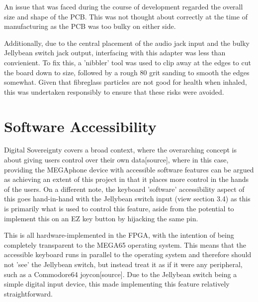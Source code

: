 An issue that was faced during the course of development regarded the overall size and shape of the PCB.
This was not thought about correctly at the time of manufacturing as the PCB was too bulky on either side.

Additionally, due to the central placement of the audio jack input and the bulky Jellybean switch jack output, interfacing with this adapter was less than convienient.
To fix this, a 'nibbler' tool was used to clip away at the edges to cut the board down to size, followed by a rough 80 grit sanding to smooth the edges somewhat.
Given that fibreglass particles are not good for health when inhaled, this was undertaken responsibly to ensure that these risks were avoided.


\section{Software Accessibility}
Digital Sovereignty covers a broad context, where the overarching concept is about giving users control over their own data[source], where in this case, providing the MEGAphone device with accessible software features can be argued as achieving an extent of this project in that it places more control in the hands of the users.
On a different note, the keyboard 'software' accessibility aspect of this goes hand-in-hand with the Jellybean switch input (view section 3.4) as this is primarily what is used to control this feature, aside from the potential to implement this on an EZ key button by hijacking the same pin.

This is all hardware-implemented in the FPGA, with the intention of being completely transparent to the MEGA65 operating system.
This means that the accessible keyboard runs in parallel to the operating system and therefore should not 'see' the Jellybean switch, but instead treat it as if it were any peripheral, such as a Commodore64 joycon[source].
Due to the Jellybean switch being a simple digital input device, this made implementing this feature relatively straightforward.

